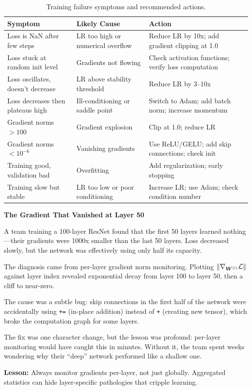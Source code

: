 \documentclass[../../main.tex]{subfiles}
\begin{document}
\begin{table}[htbp]
\centering
\caption{Training failure symptoms and recommended actions.}
\label{tab:training-diagnostics}
\begin{tabular}{@{}p{4cm}p{4cm}p{5cm}@{}}
\toprule
\textbf{Symptom} & \textbf{Likely Cause} & \textbf{Action} \\
\midrule
Loss is NaN after few steps & LR too high or numerical overflow & Reduce LR by 10x; add gradient clipping at 1.0 \\
\addlinespace
Loss stuck at random init level & Gradients not flowing & Check activation functions; verify loss computation \\
\addlinespace
Loss oscillates, doesn't decrease & LR above stability threshold & Reduce LR by 3--10x \\
\addlinespace
Loss decreases then plateaus high & Ill-conditioning or saddle point & Switch to Adam; add batch norm; increase momentum \\
\addlinespace
Gradient norms $> 100$ & Gradient explosion & Clip at 1.0; reduce LR \\
\addlinespace
Gradient norms $< 10^{-6}$ & Vanishing gradients & Use ReLU/GELU; add skip connections; check init \\
\addlinespace
Training good, validation bad & Overfitting & Add regularization; early stopping \\
\addlinespace
Training slow but stable & LR too low or poor conditioning & Increase LR; use Adam; check condition number \\
\bottomrule
\end{tabular}
\end{table}

\begin{warstory}
\textbf{The Gradient That Vanished at Layer 50}

A team training a 100-layer ResNet found that the first 50 layers learned nothing---their gradients were 1000x smaller than the last 50 layers. Loss decreased slowly, but the network was effectively using only half its capacity.

The diagnosis came from per-layer gradient norm monitoring. Plotting $\left\lVert \nabla_{\boldsymbol{W}^{(l)}} \mathcal{L} \right\rVert$ against layer index revealed exponential decay from layer 100 to layer 50, then a cliff to near-zero.

The cause was a subtle bug: skip connections in the first half of the network were accidentally using \texttt{+=} (in-place addition) instead of \texttt{+} (creating new tensor), which broke the computation graph for some layers.

The fix was one character change, but the lesson was profound: per-layer monitoring would have caught this in minutes. Without it, the team spent weeks wondering why their ``deep'' network performed like a shallow one.

\textbf{Lesson:} Always monitor gradients per-layer, not just globally. Aggregated statistics can hide layer-specific pathologies that cripple learning.
\end{warstory}
\end{document}
